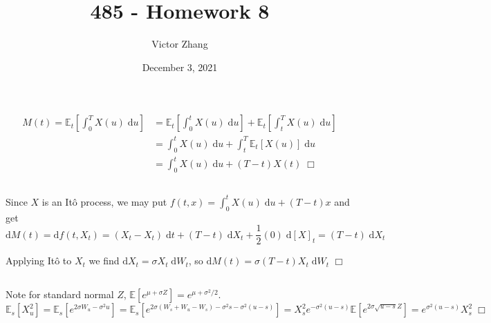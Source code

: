 \documentclass{article}
\title{485 - Homework 8}
\author{Victor Zhang}
\date{December 3, 2021}
\begin{document}
\maketitle

\section{}
\subsection{}
\begin{equation*}
\begin{split}
M(t) = \mathbb{E}_t \left[\int_0^T X(u) \;\mathrm{d}u \right] &= \mathbb{E}_t \left[\int_0^t X(u) \;\mathrm{d}u \right] + \mathbb{E}_t \left[ \int_t^T X(u) \;\mathrm{d}u \right]\\
&= \int_0^t X(u) \;\mathrm{d}u + \int_t^T \mathbb{E}_t[X(u)] \;\mathrm{d}u\\
&= \int_0^t X(u) \;\mathrm{d}u + (T - t)X(t) \; \Box
\end{split}
\end{equation*}

\subsection{}
Since $X$ is an It\^o process, we may put $f(t,x) = \int_0^t X(u) \;\mathrm{d}u + (T - t)x$ and get
$$\mathrm{d}M(t) = \mathrm{d}f(t,X_t) = (X_t - X_t)\;\mathrm{d}t + (T - t)\;\mathrm{d}X_t + \frac{1}{2}(0)\;\mathrm{d}[X]_t = (T - t)\;\mathrm{d}X_t$$

Applying It\^o to $X_t$ we find $\mathrm{d}X_t = \sigma X_t \;\mathrm{d}W_t$, so $\mathrm{d}M(t) = \sigma(T-t)X_t \;\mathrm{d}W_t$ $\Box$

\subsection{}
Note for standard normal $Z$, $\mathbb{E}[e^{\mu + \sigma Z}] = e^{\mu + \sigma^2/2}$.
$$\mathbb{E}_s[X^2_u] = \mathbb{E}_s[e^{2\sigma W_u - \sigma^2u}] = \mathbb{E}_s[e^{2\sigma (W_s + W_u - W_s) - \sigma^2s - \sigma^2(u-s)}] = X^2_se^{-\sigma^2(u-s)} \mathbb{E}[e^{2\sigma\sqrt{u-s}Z}] = e^{\sigma^2(u-s)}X_s^2 \; \Box$$
\end{document}
